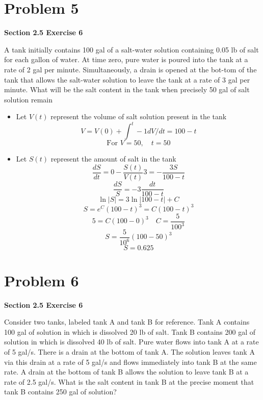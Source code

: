 \documentclass[hidelinks]{article}
\begin{document}
\section*{Problem 5}
\textbf{Section 2.5 Exercise 6}

A tank initially contains 100 gal of a salt-water solution containing 0.05 lb of salt for each gallon of water. At time zero, pure water is poured into the tank at a rate of 2 gal per minute. Simultaneously, a drain is opened at the bot-tom of the tank that allows the salt-water solution to leave the tank at a rate of 3 gal per minute. What will be the salt content in the tank when precisely 50 gal of salt solution remain


\begin{itemize}
    \item[ ]  Let $V(t)$ represent the volume of salt solution present in the tank
    \[
        V = V(0) + \int^t -1 dV/dt = 100 - t
    \]
    \[
        \text{For } V  = 50, \quad t = 50
    \]
    \item[ ] Let $S(t)$ represent the amount of salt in the tank
    \[
        \frac{dS}{dt} = 0 - \frac{S(t)}{V(t)} 3 = -\frac{3S}{100 - t}
    \]
    \[
        \frac{dS}{S} = -3\frac{dt}{100 - t}
    \]
    \[
        \ln|S| = 3\ln|100 - t| + C
    \]
    \[
    S = e^C (100-t)^3 = C(100-t)^3
    \]
    \[
        5 = C(100 - 0)^3 \quad C = \frac{5}{100^3}
    \]
    \[
        S = \frac{5}{10^6}(100 - 50)^3 
    \]
    \[
        S = 0.625
    \]
\end{itemize}
\newpage
\section*{Problem 6}
\textbf{Section 2.5 Exercise 6}

Consider two tanks, labeled tank A and tank B for reference. Tank A contains 100 gal of solution in which is dissolved 20 lb of salt. Tank B contains 200 gal of solution in which is dissolved 40 lb of salt. Pure water flows into tank A at a rate of 5 gal/s. There is a drain at the bottom of tank A. The solution leaves tank A via this drain at a rate of 5 gal/s and flows immediately into tank B at the same rate. A drain at the bottom of tank B allows the solution to leave tank B at a rate of 2.5 gal/s. What is the salt content in tank B at the precise moment that tank B contains 250 gal of solution? 
\end{document}

